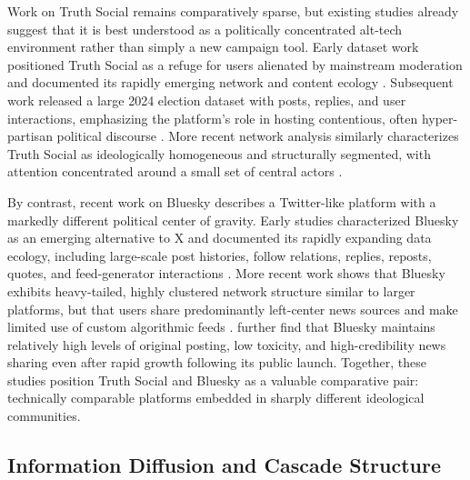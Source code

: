 \documentclass[letterpaper]{article} %
\begin{document}
Work on Truth Social remains comparatively sparse, but existing studies already suggest that it is best understood as a politically concentrated alt-tech environment rather than simply a new campaign tool. Early dataset work positioned Truth Social as a refuge for users alienated by mainstream moderation and documented its rapidly emerging network and content ecology \cite{gerard_truth_2023}. Subsequent work released a large 2024 election dataset with posts, replies, and user interactions, emphasizing the platform's role in hosting contentious, often hyper-partisan political discourse \cite{shah_unfiltered_2024}. More recent network analysis similarly characterizes Truth Social as ideologically homogeneous and structurally segmented, with attention concentrated around a small set of central actors \cite{hughes_truthsocial_2025}.

By contrast, recent work on Bluesky describes a Twitter-like platform with a markedly different political center of gravity. Early studies characterized Bluesky as an emerging alternative to X and documented its rapidly expanding data ecology, including large-scale post histories, follow relations, replies, reposts, quotes, and feed-generator interactions \cite{failla_im_2024}. More recent work shows that Bluesky exhibits heavy-tailed, highly clustered network structure similar to larger platforms, but that users share predominantly left-center news sources and make limited use of custom algorithmic feeds \cite{quelle_bluesky_2024}. \citet{nogara_bluesky_2026} further find that Bluesky maintains relatively high levels of original posting, low toxicity, and high-credibility news sharing even after rapid growth following its public launch. Together, these studies position Truth Social and Bluesky as a valuable comparative pair: technically comparable platforms embedded in sharply different ideological communities.



\subsection{Information Diffusion and Cascade Structure}
\end{document}
